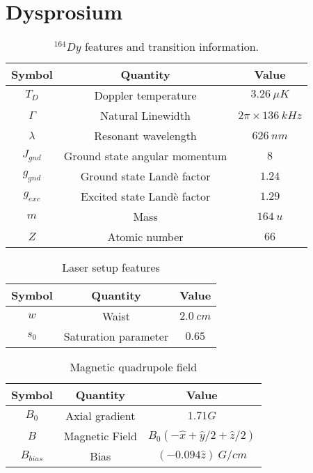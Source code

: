 %
\section{Dysprosium}
\label{eq:dysprosium}
%

\begin{table}[ht!]
    \centering
    \begin{tabular}{|c|c|c|}
        \hline
        \textbf{Symbol} & \textbf{Quantity} & \textbf{Value} \\ \hline
        $ T_D $ & Doppler temperature & $ 3.26\ \mu K $ \\
        $ \Gamma $ & Natural Linewidth & $ 2\pi \times 136\ kHz $ \\
        $ \lambda $ & Resonant wavelength & $ 626\ nm $ \\
        $ J_{gnd} $ & Ground state angular momentum & $ 8 $ \\
        $ g_{gnd} $ & Ground state Landè factor & $ 1.24 $ \\
        $ g_{exc} $ & Excited state Landè factor & $ 1.29 $ \\
        $ m $ & Mass & $ 164\ u $ \\
        $ Z $ & Atomic number & $ 66 $ \\
        \hline
    \end{tabular}
    \caption{$ {}^{164}Dy $ features and transition information.}
    \label{tab:164Dy}
\end{table}

\begin{table}[ht!]
    \centering
    \begin{tabular}{|c|c|c|}
        \hline
        \textbf{Symbol} & \textbf{Quantity} & \textbf{Value} \\ \hline
        $ w $ & Waist & $ 2.0\ cm $ \\
        $ s_0 $ & Saturation parameter & $ 0.65 $ \\
        \hline
    \end{tabular}
    \caption{Laser setup features}
    \label{tab:lasers-setup}
\end{table}

\begin{table}[ht!]
    \centering
    \begin{tabular}{|c|c|c|}
        \hline
        \textbf{Symbol} & \textbf{Quantity} & \textbf{Value} \\ \hline
        $ B_0 $ & Axial gradient & $ 1.71 G $ \\
        $ B $ & Magnetic Field & $ B_0(-\hat{x} + \hat{y}/2 + \hat{z} / 2) $ \\
        $ B_{bias} $ & Bias & $ (-0.094 \hat{z})\ G / cm $ \\
        \hline
    \end{tabular}
    \caption{Magnetic quadrupole field}
    \label{tab:magnetic-field}
\end{table}
